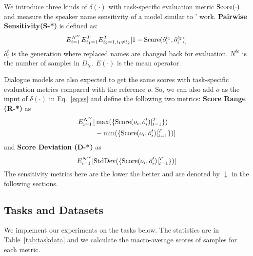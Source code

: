 We introduce three kinds of $\delta(\cdot)$ with task-specific evaluation metric $\rm{Score}(\cdot)$ and measure the speaker name sensitivity of a model similar to \citet{prabhakaran2019perturbation}' work.
\textbf{Pairwise Sensitivity(S-*)} is defined as:
\begin{equation}
	E_{i=1}^{N^{te}} E_{t_1=1}^{T}E_{t_2=1, t_1\neq t_2}^T[1-{\rm Score} (\hat{o}^{t_1}_i, \hat{o}^{t_2}_i)]
\end{equation}
$\hat{o}^t_i$ is the generation where replaced names are changed back for evaluation. $N^{te}$ is the number of samples in $D_{te}$. $E(\cdot)$ is the mean operator. 

Dialogue models are also expected to get the same scores with task-specific evaluation metrics compared with the reference $o$. So, we can also add $o$ as the input of $\delta(\cdot)$ in Eq.~\ref{eq:ss} and define the following two metrics:
\textbf{Score Range (R-*)} as
\begin{equation}
	\begin{aligned}
		E_{i=1}^{N^{te}} [& \max(\{{\rm Score}(o_i, \hat{o}^t_i)|_{t=1}^T\}) \\
		&-  \min(\{{\rm Score}(o_i, \hat{o}^t_i)|_{t=1}^T\})]
	\end{aligned}
\end{equation}
and \textbf{Score Deviation (D-*)} as
\begin{equation}
	E_{i=1}^{N^{te}} [ {\rm StdDev} (\{{\rm Score}(o_i, \hat{o}^t_i)|_{t=1}^T\}) ]
\end{equation}
The sensitivity metrics here are the lower the better and are denoted by $\downarrow$ in the following sections. %



\subsection{Tasks and Datasets}

We implement our experiments on the tasks below. The statistics are in Table~\ref{tab:taskdata} and we calculate the macro-average scores of samples for each metric.

